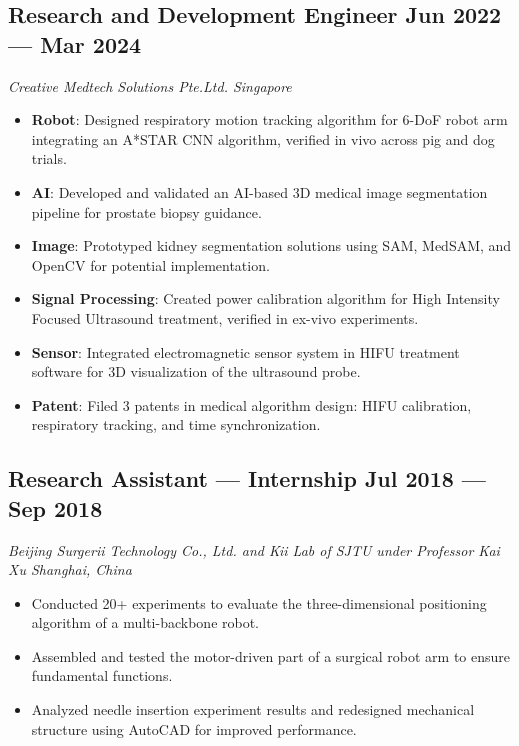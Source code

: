 \documentclass[a4paper,10pt]{article}
\newcommand{\subtextit}[1]{
\vspace{0cm} 
\textit{ #1 
\vspace{-0.1cm}} }
\newenvironment{zitemize}{
\vspace{0.1cm}
\begin{itemize}\itemsep 1.5pt \parskip 2pt \parsep 5pt}
{\end{itemize}\vspace{-0.3cm}}
\begin{document}
\subsection*{\large Research and Development Engineer \hfill Jun 2022 --- Mar 2024}
\subtextit{Creative Medtech Solutions Pte.Ltd. \hfill Singapore}
\begin{zitemize}
    \item \textbf{Robot}: Designed respiratory motion tracking algorithm for 6-DoF robot arm integrating an A*STAR CNN algorithm, verified in vivo across pig and dog trials.
    \item \textbf{AI}: Developed and validated an AI-based 3D medical image segmentation pipeline for prostate biopsy guidance.
    \item \textbf{Image}: Prototyped kidney segmentation solutions using SAM, MedSAM, and OpenCV for potential implementation.
    \item \textbf{Signal Processing}: Created power calibration algorithm for High Intensity Focused Ultrasound treatment, verified in ex-vivo experiments.
    \item \textbf{Sensor}: Integrated electromagnetic sensor system in HIFU treatment software for 3D visualization of the ultrasound probe.
    \item \textbf{Patent}: Filed 3 patents in medical algorithm design: HIFU calibration, respiratory tracking, and time synchronization.
\end{zitemize}

\subsection*{\large Research Assistant --- Internship \hfill Jul 2018 --- Sep 2018}
\subtextit{Beijing Surgerii Technology Co., Ltd. and Kii Lab of SJTU under Professor Kai Xu \hfill Shanghai, China}
\begin{zitemize}
    \item Conducted 20+ experiments to evaluate the three-dimensional positioning algorithm of a multi-backbone robot.
    \item Assembled and tested the motor-driven part of a surgical robot arm to ensure fundamental functions.
    \item Analyzed needle insertion experiment results and redesigned mechanical structure using AutoCAD for improved performance.
\end{zitemize}

\end{document}
